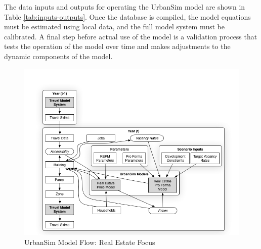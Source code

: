 The data inputs and outputs for operating the UrbanSim model are shown in Table \ref{tab:inputs-outputs}.  Once the database is compiled, the model equations must be estimated using local data, and the full model system must be calibrated.  A final step before actual use of the model is a validation process that tests the operation of the model over time and makes adjustments to the dynamic components of the model.  

\begin{figure}[h]
\center
 \includegraphics[width=5.0in]{graphics/ParcelRealEstateModel.png}
\caption{UrbanSim Model Flow: Real Estate Focus}
\label{fig:parcel-models}
\end{figure}




